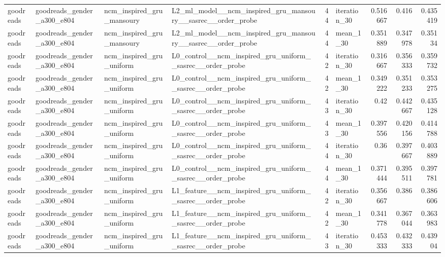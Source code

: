 \begin{table}[htbp!]
\begin{tabular}{llllrlrrr}
goodreads & goodreads\_gender\_a300\_e804 & ncm\_inspired\_gru\_mansoury & L2\_ml\_model\_\_ncm\_inspired\_gru\_mansoury\_\_sasrec\_\_order\_probe & 44 & iteration\_30 & 0.516667 & 0.416 & 0.435419 \\
goodreads & goodreads\_gender\_a300\_e804 & ncm\_inspired\_gru\_mansoury & L2\_ml\_model\_\_ncm\_inspired\_gru\_mansoury\_\_sasrec\_\_order\_probe & 44 & mean\_1\_30 & 0.351889 & 0.347978 & 0.35134 \\
goodreads & goodreads\_gender\_a300\_e804 & ncm\_inspired\_gru\_uniform & L0\_control\_\_ncm\_inspired\_gru\_uniform\_\_sasrec\_\_order\_probe & 42 & iteration\_30 & 0.316667 & 0.356333 & 0.359732 \\
goodreads & goodreads\_gender\_a300\_e804 & ncm\_inspired\_gru\_uniform & L0\_control\_\_ncm\_inspired\_gru\_uniform\_\_sasrec\_\_order\_probe & 42 & mean\_1\_30 & 0.349222 & 0.351233 & 0.353275 \\
goodreads & goodreads\_gender\_a300\_e804 & ncm\_inspired\_gru\_uniform & L0\_control\_\_ncm\_inspired\_gru\_uniform\_\_sasrec\_\_order\_probe & 43 & iteration\_30 & 0.42 & 0.442667 & 0.435128 \\
goodreads & goodreads\_gender\_a300\_e804 & ncm\_inspired\_gru\_uniform & L0\_control\_\_ncm\_inspired\_gru\_uniform\_\_sasrec\_\_order\_probe & 43 & mean\_1\_30 & 0.397556 & 0.420156 & 0.414788 \\
goodreads & goodreads\_gender\_a300\_e804 & ncm\_inspired\_gru\_uniform & L0\_control\_\_ncm\_inspired\_gru\_uniform\_\_sasrec\_\_order\_probe & 44 & iteration\_30 & 0.36 & 0.397667 & 0.403889 \\
goodreads & goodreads\_gender\_a300\_e804 & ncm\_inspired\_gru\_uniform & L0\_control\_\_ncm\_inspired\_gru\_uniform\_\_sasrec\_\_order\_probe & 44 & mean\_1\_30 & 0.371444 & 0.395511 & 0.397781 \\
goodreads & goodreads\_gender\_a300\_e804 & ncm\_inspired\_gru\_uniform & L1\_feature\_\_ncm\_inspired\_gru\_uniform\_\_sasrec\_\_order\_probe & 42 & iteration\_30 & 0.356667 & 0.386 & 0.386606 \\
goodreads & goodreads\_gender\_a300\_e804 & ncm\_inspired\_gru\_uniform & L1\_feature\_\_ncm\_inspired\_gru\_uniform\_\_sasrec\_\_order\_probe & 42 & mean\_1\_30 & 0.341778 & 0.367044 & 0.363983 \\
goodreads & goodreads\_gender\_a300\_e804 & ncm\_inspired\_gru\_uniform & L1\_feature\_\_ncm\_inspired\_gru\_uniform\_\_sasrec\_\_order\_probe & 43 & iteration\_30 & 0.453333 & 0.432333 & 0.43904 \\

\end{tabular}
\end{table}

